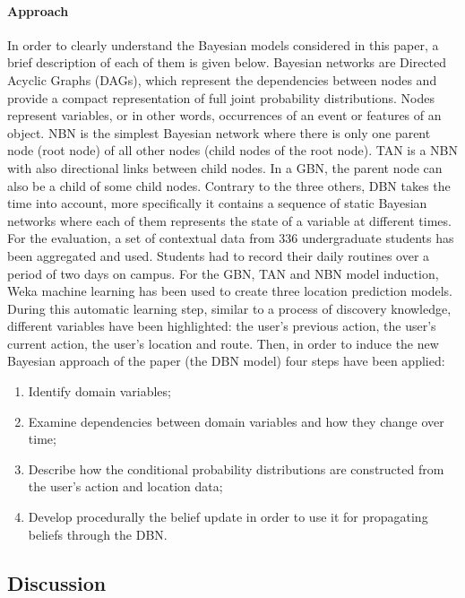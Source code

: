 \paragraph{Approach}

In order to clearly understand the Bayesian models considered in this paper, a brief description of each of them is given below. Bayesian networks are Directed Acyclic Graphs (DAGs), which represent the dependencies between nodes and provide a compact representation of full joint probability distributions. Nodes represent variables, or in other words, occurrences of an event or features of an object. NBN is the simplest Bayesian network where there is only one parent node (root node) of all other nodes (child nodes of the root node). TAN is a NBN with also directional links between child nodes. In a GBN, the parent node can also be a child of some child nodes. Contrary to the three others, DBN takes the time into account, more specifically it contains a sequence of static Bayesian networks where each of them represents the state of a variable at different times.
For the evaluation, a set of contextual data from 336 undergraduate students has been aggregated and used. Students had to record their daily routines over a period of two days on campus. For the GBN, TAN and NBN model induction, Weka machine learning has been used to create three location prediction models. During this automatic learning step, similar to a process of discovery knowledge, different variables have been highlighted: the user's previous action, the user's current action, the user's location and route. Then, in order to induce the new Bayesian approach of the paper (the DBN model) four steps have been applied:

\begin{enumerate}

\item Identify domain variables;
\item Examine dependencies between domain variables and how they change over time;
\item Describe how the conditional probability distributions are constructed from the user's action and location data;
\item Develop procedurally the belief update in order to use it for propagating beliefs through the DBN.

\end{enumerate}

\subsection{Discussion} \label{lect4-disc}

